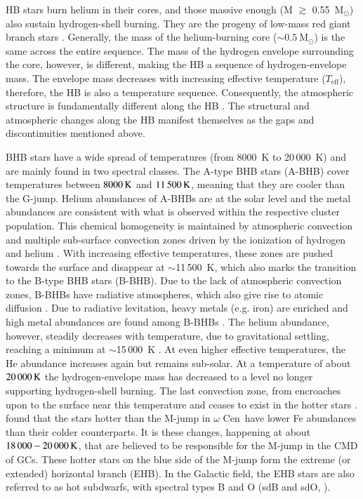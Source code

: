 \documentclass{aa}
\newcommand{\msun}{$\text{M}_\odot$}
\newcommand{\teff}{$T_{\text{eff}}$}
\newcommand{\Cen}{$\omega$ Cen}
\begin{document}
HB stars burn helium in their cores, and those massive enough (M $\gtrsim$ 0.55~\msun) also sustain hydrogen-shell burning. They are the progeny of low-mass red giant branch stars \citep{hoyle55,faulkner66}.
Generally, the mass of the helium-burning core ($\sim 0.5~\text{M}_\odot$) is the same across the entire sequence.
The mass of the hydrogen envelope surrounding the core, however, is different, making the HB a sequence of hydrogen-envelope mass.
The envelope mass decreases with increasing effective temperature (\teff), therefore, the HB is also a temperature sequence.
Consequently, the atmospheric structure is fundamentally different along the HB \citep{dorman92,brown16}.
The structural and atmospheric changes along the HB manifest themselves  as the gaps and discontinuities mentioned above.

BHB stars have a wide spread of temperatures (from 8000~K to 20\,000~K) and are mainly found in two spectral classes.
The A-type BHB stars (A-BHB) cover temperatures between $8000\,\rm K$ and $11\,500\, \rm K$, meaning that they are cooler than the G-jump.
Helium abundances of A-BHBs are at the solar level \citep{adelman96,kinman00,behr03} and the metal abundances are consistent with what is observed within the respective cluster population.
This chemical homogeneity is maintained by atmospheric convection and multiple sub-surface convection zones driven by the ionization of hydrogen and helium \citep{caloi99,sweigart02,brown16}.
With increasing effective temperatures, these zones are pushed towards the surface and disappear at $\sim$11\,500~K, which also marks the transition to the B-type BHB stars (B-BHB).
Due to the lack of atmospheric convection zones, B-BHBs have radiative atmospheres, which also give rise to atomic diffusion \citep[radiative levitation versus gravitational settling, see e.g.][]{huibon2000,quievy2009,2011A&A...529A..60M}.
Due to radiative levitation, heavy metals (e.g. iron) are enriched and high metal abundances are found among B-BHBs \citep{behr03,pace2006}.
The helium abundance, however, steadily decreases with temperature, due to gravitational settling, reaching a minimum at $\sim$15\,000~K \citep{monibidin2012}. At even higher effective temperatures, the He abundance increases again but remains sub-solar.
At a temperature of about $20\,000\,\rm K$ the hydrogen-envelope mass has decreased to a level no longer supporting hydrogen-shell burning. 
The last convection zone, from  encroaches upon to the surface near this temperature and ceases to exist in the hotter stars \citep{brown16}. \citet{brown17} found that the stars hotter than the M-jump in \Cen\ have lower Fe abundances than their colder counterparts. 
It is these changes, happening at about $18\,000-20\,000\,\rm K$, that are believed to be responsible for the M-jump in the CMD of GCs. These hotter stars on the blue side of the M-jump form the extreme (or extended) horizontal branch (EHB).
In the Galactic field, the EHB stars are also referred to as hot subdwarfs, with spectral types B and O (sdB and sdO, \citealt{2009ARA&A..47..211H,heber16}). 
\end{document}
